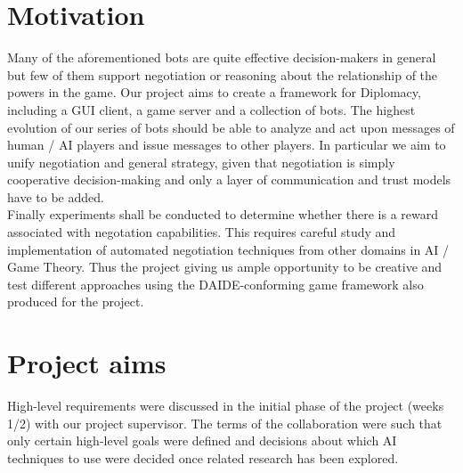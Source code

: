 \documentclass[pdftex,11pt,a4paper]{report}
\begin{document}

\pagebreak

\section{Motivation}

Many of the aforementioned bots are quite effective decision-makers in
general but few of them support negotiation or reasoning about the relationship of
the powers in the game. Our project aims to create a framework for
Diplomacy, including a GUI client, a game server and a collection of
bots. The highest evolution of our series of bots should be able to
analyze and act upon messages of human / AI players and issue messages
to other players. In particular we aim to unify negotiation and
general strategy, given that negotiation is simply cooperative 
decision-making and only a layer of communication and trust models have
to be added. \\

Finally experiments shall be conducted to determine whether there is a
reward associated with negotation capabilities. This requires careful
study and implementation of automated negotiation techniques from
other domains in AI / Game Theory. Thus the project giving us ample
opportunity to be creative and test different approaches using the
DAIDE-conforming game framework also produced for the project.

\section{Project aims}

High-level requirements were discussed in the initial phase of the
project (weeks 1/2) with our project supervisor. The terms of the
collaboration were such that only certain high-level goals were
defined and decisions about which AI techniques to use were decided once
related research has been explored.
\end{document}
